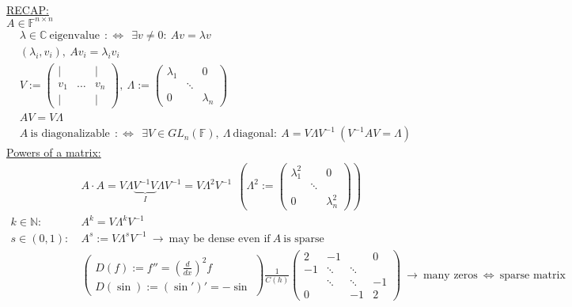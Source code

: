 \begin{frame}
~\\
{\blank
\underline{RECAP:}\\
$ A\in\mathbb{F}^{n\times n} $
\begin{align*}
&\lambda\in\mathbb{C}~\text{eigenvalue}~~:\Leftrightarrow~~\exists v\neq 0:~Av=\lambda v\\
&(\lambda_i, v_i),~Av_i=\lambda_i v_i\\
&V:=\begin{pmatrix}
|&~&|\\
v_1&\dots&v_n\\
|&~&|
\end{pmatrix},~
\Lambda:=\begin{pmatrix}
\lambda_1&~&0\\
~&\ddots&~\\
0&~&\lambda_n
\end{pmatrix}\\
&AV=V\Lambda\\
&A~\text{is diagonalizable}~~:\Leftrightarrow~~\exists V\in GL_n(\mathbb{F}),~\Lambda~\text{diagonal}:~A=V\Lambda V^{-1}~(V^{-1}AV=\Lambda)
\end{align*}
\underline{Powers of a matrix:}
\begin{align*}
&A\cdot A=V\Lambda\underbrace{V^{-1}V}_{I}\Lambda V^{-1}=V\Lambda^2V^{-1}~~(\Lambda^2:=\begin{pmatrix}
\lambda_1^2&~&0\\
~&\ddots&~\\
0&~&\lambda_n^2
\end{pmatrix})\\
k\in\mathbb{N}:~&A^k=V\Lambda^kV^{-1}\\
s\in (0,1):~&A^s:=V\Lambda^sV^{-1}~\rightarrow~\text{may be dense even if}~A~\text{is sparse}\\
&\begin{pmatrix}
D(f):=f''=(\frac{d}{dx})^2f\\
D(\sin):=(\sin')'=-\sin
\end{pmatrix}
\frac{1}{C(h)}\begin{pmatrix}
2&-1&~&0\\
-1&\ddots&\ddots&~\\
~&\ddots&\ddots&-1\\
0&~&-1&2
\end{pmatrix}~\rightarrow~\text{many zeros}~\Leftrightarrow~\text{sparse matrix}
\end{align*}
}
\end{frame}

